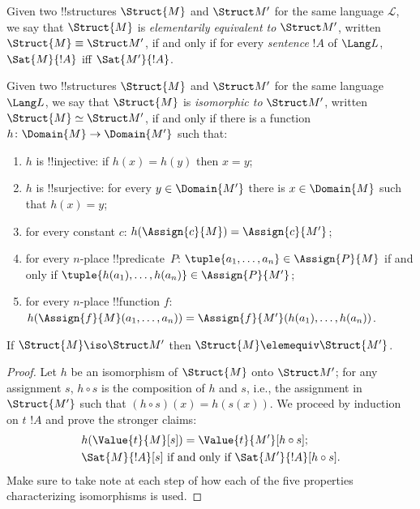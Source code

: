 \documentclass[../../include/open-logic-section]{subfiles}
\begin{document}

\begin{defn}
Given two !!{structure}s $\Struct{M}$ and $\Struct M'$ for the same
language $\mathcal{L}$, we say that $\Struct{M}$ is \emph{elementarily
  equivalent to} $\Struct M'$, written $\Struct{M} \equiv \Struct M'$,
if and only if for every \emph{sentence} $!A$ of $\Lang L$,
$\Sat{M}{!A}$ iff $\Sat{M'}{!A}$.
\end{defn}

\begin{defn}
Given two !!{structure}s $\Struct{M}$ and $\Struct M'$ for the same
language $\Lang L$, we say that $\Struct{M}$ is \emph{isomorphic to}
$\Struct M'$, written $\Struct{M} \simeq \Struct M'$, if and only if
there is a function $h\colon \Domain{M} \to \Domain{M'}$ such that:
\begin{enumerate}
\item $h$ is !!{injective}: if $h(x) =
  h(y)$ then $x = y$; 
\item $h$ is !!{surjective}: for every $y \in \Domain{M'}$ there
  is $x \in \Domain{M}$ such that $h(x) = y$;
\item for every constant $c$: $h(\Assign{c}{M}) = \Assign{c}{M'}$;
\item for every $n$-place !!{predicate}~$P$: $\tuple{a_1, \dots,
  a_n}\in \Assign{P}{M}$ if and only if $\tuple{h(a_1), \dots, h(a_n)}
    \in \Assign{P}{M'}$;
\item for every $n$-place !!{function} $f$:
  $h(\Assign{f}{M}(a_1, \dots, a_n)) =
  \Assign{f}{M'}(h(a_1), \dots, h(a_n))$.
\end{enumerate}
\end{defn}

\begin{thm}
If $\Struct{M} \iso \Struct M'$ then $\Struct{M} \elemequiv
\Struct{M'}$.
\end{thm}

\begin{proof}
Let $h$ be an isomorphism of $\Struct{M}$ onto $\Struct M'$; for any
assignment $s$, $h \circ s$ is the composition of $h$ and $s$, i.e.,
the assignment in $\Struct{M'}$ such that $(h \circ s)(x) = h(s(x))$.
We proceed by induction on $t$ $!A$ and prove the stronger claims:
\begin{align*}
  &  h(\Value{t}{M}[s]) = \Value{t}{M'}[h\circ s];\\
  &  \Sat{M}{!A}[s] \text{ if and only if }
  \Sat{M'}{!A}[h \circ s].
\end{align*}
Make sure to take note at each step of how each of the five properties
characterizing isomorphisms is used.    
\end{proof}
\end{document}
